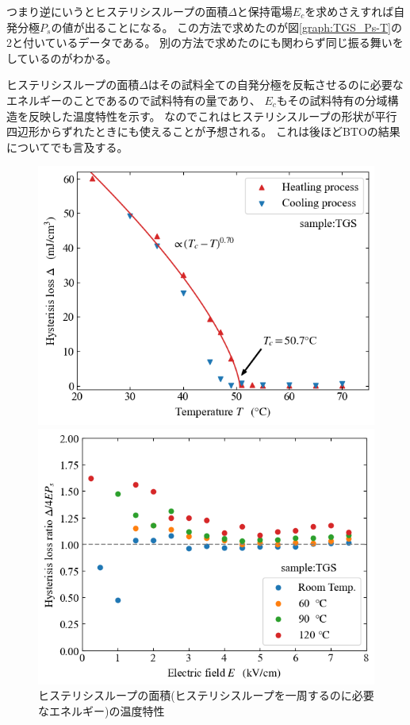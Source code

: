 \documentclass[9pt,dvipdfmx,a4paper]{jsarticle}
\begin{document}
つまり逆にいうとヒステリシスループの面積\(\Delta\)と保持電場\(E_c\)を求めさえすれば自発分極\(P_s\)の値が出ることになる。
この方法で求めたのが図\ref{graph:TGS_Ps-T}の2と付いているデータである。
別の方法で求めたのにも関わらず同じ振る舞いをしているのがわかる。

ヒステリシスループの面積\(\Delta\)はその試料全ての自発分極を反転させるのに必要なエネルギーのことであるので試料特有の量であり、
\(E_c\)もその試料特有の分域構造を反映した温度特性を示す。
なのでこれはヒステリシスループの形状が平行四辺形からずれたときにも使えることが予想される。
これは後ほどBTOの結果についてでも言及する。

\begin{figure}[H]
    \begin{minipage}[t]{0.48\columnwidth}
        \centering
        \includegraphics[width=\columnwidth]{TGS_Delta-T.png}
        \caption{\small{ヒステリシスループの面積(ヒステリシスループを一周するのに必要なエネルギー)の温度特性}}
        \label{graph:TGS_Delta-T}
    \end{minipage}
    \hfill
    \begin{minipage}[t]{0.48\columnwidth}
        \centering
        \includegraphics[width=\columnwidth]{TGS_Delta-E.png}

\end{minipage}
\end{figure}
\end{document}
